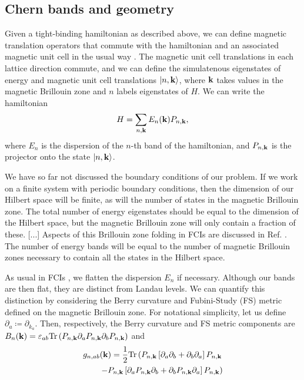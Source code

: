 \documentclass[aps,prb,twocolumn,letterpaper,twoside,nobalancelastpage,groupedaddress,amsmath,amssymb,floatfix,citeautoscript]{revtex4-1}
\begin{document}
\subsection{Chern bands and geometry}
Given a tight-binding hamiltonian as described above, we can define magnetic translation operators that commute with the hamiltonian and an associated magnetic unit cell in the usual way \cite{FradkinBook}. The magnetic unit cell translations in each lattice direction commute, and we can define the simulatenous eigenstates of energy and magnetic unit cell translations $\ket{n,{\bf k}}$, where ${\bf k}$ takes values in the magnetic Brillouin zone and $n$ labels eigenstates of $H$. We can write the hamiltonian 
\begin{align*}
H = \sum_{n,\mathbf{k}} E_{n}({\bf k}) P_{n,{\bf k}},
\end{align*}
where $E_n$ is the dispersion of the $n$-th band of the hamiltonian, and $P_{n,{\bf k}}$ is the projector onto the state $\ket{n,{\bf k}}$.

We have so far not discussed the boundary conditions of our problem. If we work on a finite system with periodic boundary conditions, then the dimension of our Hilbert space will be finite, as will the number of states in the magnetic Brillouin zone. The total number of energy eigenstates should be equal to the dimension of the Hilbert space, but the magnetic Brillouin zone will only contain a fraction of these. [...] Aspects of this Brillouin zone folding in FCIs are discussed in Ref. . The number of energy bands will be equal to the number of magnetic Brillouin zones necessary to contain all the states in the Hilbert space.

As usual in FCIs \cite{???}, we flatten the dispersion $E_n$ if necessary. Although our bands are then flat, they are distinct from Landau levels. We can quantify this distinction by considering the Berry curvature and Fubini-Study (FS) metric defined on the magnetic Brillouin zone. For notational simplicity, let us define $\partial_a \coloneqq \partial_{k_a}$. Then, respectively, the Berry curvature and FS metric components are $B_n({\bf k}) = \varepsilon_{ab}\text{Tr}\left(P_{n,{\bf k}}\partial_{a}P_{n,{\bf k}}\partial_b P_{n,{\bf k}}\right)$ and
\begin{align*}
g_{n,ab}({\bf k}) = \frac{1}{2}\text{Tr}\left(P_{n,{\bf k}}\left[\partial_a\partial_b + \partial_b \partial_a\right]P_{n,{\bf k}}\right.\\
\left. \quad\quad-P_{n,{\bf k}}\left[\partial_aP_{n,{\bf k}}\partial_b+ \partial_bP_{n,{\bf k}}\partial_a\right] P_{n,{\bf k}}\right)
\end{align*}
\end{document}
